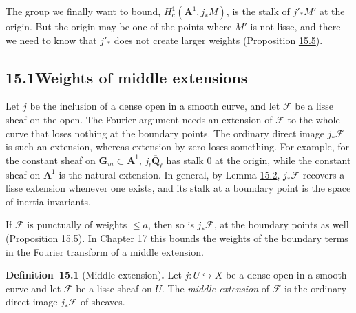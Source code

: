 \documentclass[11pt]{article}
\newenvironment{bpstatement}[2]{\par\addvspace{0.6\baselineskip}\noindent\textbf{#1}#2\textbf{.}\enspace\ignorespaces}
  {\par\addvspace{0.4\baselineskip}}
\begin{document}
The group we finally want to bound, \(H^1_c(\mathbf A^1,j_*M)\), is the stalk of \(j'_*M'\) at the origin. But the origin may be one of the points where \(M'\) is not lisse, and there we need to know that \(j'_*\) does not create larger weights (Proposition \hyperref[bp134]{15.5}).

\subsection*{\texorpdfstring{15.1\quad Weights of middle extensions}{15.1 Weights of middle extensions}}
\label{bp124}%
\label{bp125}%
Let \(j\) be the inclusion of a dense open in a smooth curve, and let \(\mathcal F\) be a lisse sheaf on the open. The Fourier argument needs an extension of \(\mathcal F\) to the whole curve that loses nothing at the boundary points. The ordinary direct image \(j_*\mathcal F\) is such an extension, whereas extension by zero loses something. For example, for the constant sheaf on \(\mathbf G_m\subset\mathbf A^1\), \(j_!\overline{\mathbf Q}_\ell\) has stalk \(0\) at the origin, while the constant sheaf on \(\mathbf A^1\) is the natural extension. In general, by Lemma \hyperref[bp127]{15.2}, \(j_*\mathcal F\) recovers a lisse extension whenever one exists, and its stalk at a boundary point is the space of inertia invariants.

If \(\mathcal F\) is punctually of weights \(\le a\), then so is \(j_*\mathcal F\), at the boundary points as well (Proposition \hyperref[bp134]{15.5}). In Chapter \hyperref[bp223]{17} this bounds the weights of the boundary terms in the Fourier transform of a middle extension.

\label{bp126}%
\begin{bpstatement}{Definition~15.1}{ (Middle extension)}
Let \(j:U\hookrightarrow X\) be a dense open in a smooth curve and let \(\mathcal F\) be a lisse sheaf on \(U\). The \emph{middle extension} of \(\mathcal F\) is the ordinary direct image \(j_*\mathcal F\) of sheaves.
\end{bpstatement}
\end{document}
